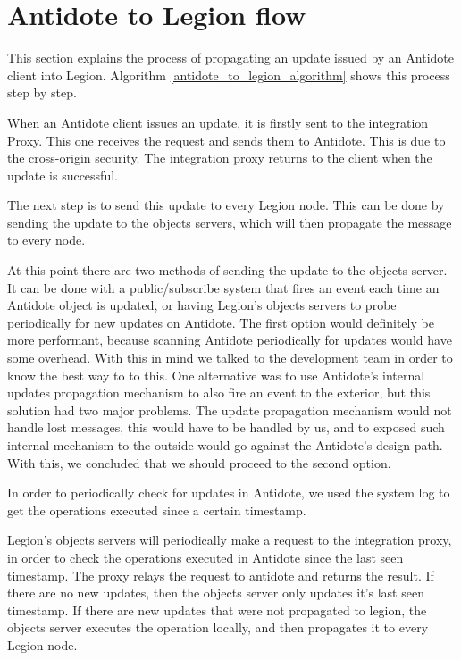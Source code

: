 \section{Antidote to Legion flow}
\label{sec:antidote_to_legion_flow}
This section explains the process of propagating an update issued by an Antidote client into Legion. Algorithm \ref{antidote_to_legion_algorithm} shows this process step by step.\par
	When an Antidote client issues an update, it is firstly sent to the integration Proxy. This one receives the request and sends them to Antidote. This is due to the cross-origin security. The integration proxy returns to the client when the update is successful.\par
	The next step is to send this update to every Legion node. This can be done by sending the update to the objects servers, which will then propagate the message to every node.\par
	At this point there are two methods of sending the update to the objects server. It can be done with a public/subscribe system that fires an event each time an Antidote object is updated, or having Legion's objects servers to probe periodically for new updates on Antidote. The first option would definitely be more performant, because scanning Antidote periodically for updates would have some overhead. With this in mind we talked to the development team in order to know the best way to to this. One alternative was to use Antidote's internal updates propagation mechanism to also fire an event to the exterior, but this solution had two major problems. The update propagation mechanism would not handle lost messages, this would have to be handled by us, and to exposed such internal mechanism to the outside would go against the Antidote's design path. With this, we concluded that we should proceed to the second option.\par
	In order to periodically check for updates in Antidote, we used the system log to get the operations executed since a certain timestamp.\par
	Legion's objects servers will periodically make a request to the integration proxy, in order to check the operations executed in Antidote since the last seen timestamp. The proxy relays the request to antidote and returns the result. If there are no new updates, then the objects server only updates it's last seen timestamp. If there are new updates that were not propagated to legion, the objects server executes the operation locally, and then propagates it to every Legion node.
	

